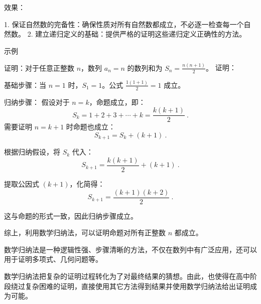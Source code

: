 效果：

1.	保证自然数的完备性：确保性质对所有自然数都成立，不必逐一检查每一个自然数。
2.	建立递归定义的基础：提供严格的证明这些递归定义正确性的方法。





示例
\begin{example}{证明：对于任意正整数 $n$，数列 $a_n=n$ 的数列和为 $S_n = \frac{n(n+1)}{2}$。}
证明：

基础步骤：当 $n = 1$ 时，$S_1 = 1$。公式 $\frac{1(1+1)}{2} = 1$ 成立。

归纳步骤：
假设对于 $n = k$，命题成立，即：
\begin{equation}
S_k = 1 + 2 + 3 + \cdots + k = \frac{k(k+1)}{2}~.
\end{equation}
需要证明 $n = k+1$ 时命题也成立：
\begin{equation}
S_{k+1} = S_k + (k+1)~.
\end{equation}

根据归纳假设，将 $S_k$ 代入：
\begin{equation}
S_{k+1} = \frac{k(k+1)}{2} + (k+1)~.
\end{equation}

提取公因式 $(k+1)$，化简得：
\begin{equation}
S_{k+1} = \frac{(k+1)(k+2)}{2}~.
\end{equation}

这与命题的形式一致，因此归纳步骤成立。

综上，利用数学归纳法，可以证明命题对所有正整数 $n$ 都成立。
\end{example}

数学归纳法是一种逻辑性强、步骤清晰的方法，不仅在数列中有广泛应用，还可以用于证明多项式、几何问题等。

数学归纳法把复杂的证明过程转化为了对最终结果的猜想。由此，也使得在高中阶段绕过复杂困难的证明，直接使用其它方法得到结果并使用数学归纳法给出证明成为可能。